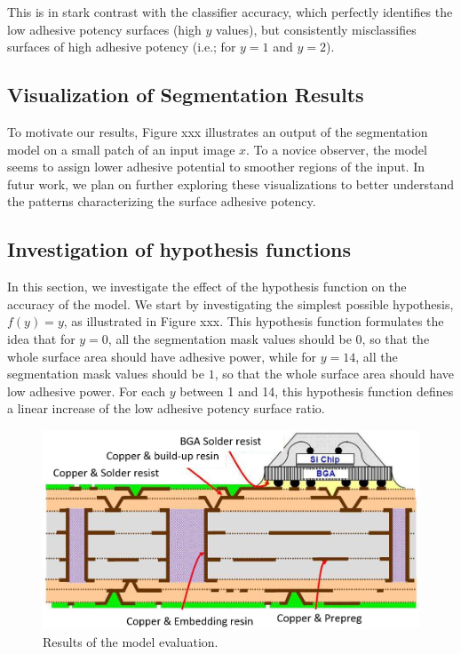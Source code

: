 \documentclass[10pt,twocolumn,letterpaper]{article}
\begin{document}
This is in stark contrast with the classifier accuracy, which perfectly identifies
the low adhesive potency surfaces (high $y$ values), but consistently misclassifies 
surfaces of high adhesive potency (i.e.; for $y=1$ and $y=2$).

\subsection{Visualization of Segmentation Results}

To motivate our results, Figure xxx illustrates an output of the segmentation model on a small patch of an input image $x$.
To a novice observer, the model seems to assign lower adhesive potential to smoother regions of the input.
In futur work, we plan on further exploring these visualizations to better understand the 
patterns characterizing the surface adhesive potency.


\subsection{Investigation of hypothesis functions}

In this section, we investigate the effect of the hypothesis function on the accuracy of the model.
We start by investigating the simplest possible hypothesis, $f(y)=y$, as illustrated in Figure xxx.
This hypothesis function formulates the idea that for $y=0$, 
all the  segmentation mask values should be 0, 
so that the whole surface area should have adhesive power, 
while for $y=14$, all the segmentation mask values should be $1$, so that 
the whole surface area should have low adhesive power.
For each $y$ between 1 and 14, this hypothesis function defines a linear increase
of the low adhesive potency surface ratio.

\begin{figure}[h]
	\centering
	\includegraphics[width=0.9\linewidth]{"./figures/Figure1"}
	\caption{
		Results of the model evaluation.
	}
\end{figure}
\end{document}
